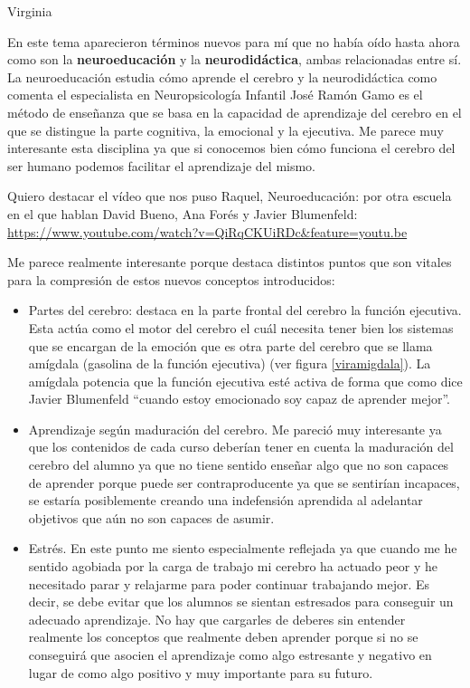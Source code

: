 \begin{opin}{\virgicolor}{Virginia}

En este tema aparecieron términos nuevos para mí que no había oído hasta ahora como son la \textbf{neuroeducación} y la \textbf{neurodidáctica}, ambas relacionadas entre sí. La neuroeducación estudia cómo aprende el cerebro y la neurodidáctica como comenta el especialista en Neuropsicología Infantil José Ramón Gamo es el método de enseñanza que se basa en la capacidad de aprendizaje del cerebro en el que se distingue la parte cognitiva, la emocional y la ejecutiva. Me parece muy interesante esta disciplina ya que si conocemos bien cómo funciona el cerebro del ser humano podemos facilitar el aprendizaje del mismo.

Quiero destacar el vídeo que nos puso Raquel, Neuroeducación: por otra escuela en el que hablan David Bueno, Ana Forés y Javier Blumenfeld: \url{https://www.youtube.com/watch?v=QiRqCKUiRDc&feature=youtu.be}


Me parece realmente interesante porque destaca distintos puntos que son vitales para la compresión de estos nuevos conceptos introducidos:

\begin{itemize}

\item Partes del cerebro: destaca en la parte frontal del cerebro la función ejecutiva. Esta actúa como el motor del cerebro el cuál necesita tener bien los sistemas que se encargan de la emoción que es otra parte del cerebro que se llama amígdala (gasolina de la función ejecutiva) (ver figura \ref{viramigdala}). La amígdala potencia que la función ejecutiva esté activa de forma que como dice Javier Blumenfeld “cuando estoy emocionado soy capaz de aprender mejor”. 

 

\item Aprendizaje según maduración del cerebro. Me pareció muy interesante ya que los contenidos de cada curso deberían tener en cuenta la maduración del cerebro del alumno ya que no tiene sentido enseñar algo que no son capaces de aprender porque puede ser contraproducente ya que se sentirían incapaces, se estaría posiblemente creando una indefensión aprendida al adelantar objetivos que aún no son capaces de asumir.   

 

\item Estrés. En este punto me siento especialmente reflejada ya que cuando me he sentido agobiada por la carga de trabajo mi cerebro ha actuado peor y he necesitado parar y relajarme para poder continuar trabajando mejor. Es decir, se debe evitar que los alumnos se sientan estresados para conseguir un adecuado aprendizaje. No hay que cargarles de deberes sin entender realmente los conceptos que realmente deben aprender porque si no se conseguirá que asocien el aprendizaje como algo estresante y negativo en lugar de como algo positivo y muy importante para su futuro. 


\end{itemize}
\end{opin}
